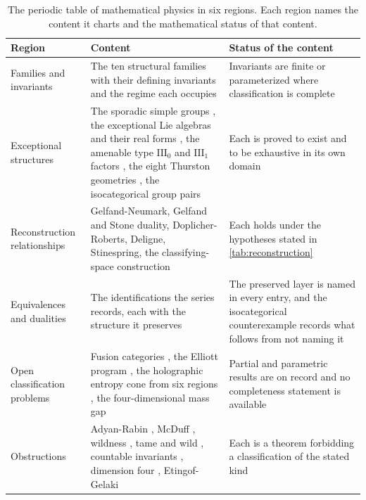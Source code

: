 \documentclass[11pt,letterpaper]{article}
\theoremstyle{definition}
\theoremstyle{remark}
\begin{document}
\begin{table}[t]
\centering
\small
\caption{The periodic table of mathematical physics in six regions. Each region names the content it charts and the mathematical status of that content.}
\label{tab:periodic}
\begin{tabularx}{\textwidth}{Y{0.62}Y{1.38}Y{1.0}}
\toprule
Region & Content & Status of the content \\
\midrule
Families and invariants & The ten structural families with their defining invariants and the regime each occupies & Invariants are finite or parameterized where classification is complete \\
Exceptional structures & The sporadic simple groups \cite{corpus-1,corpus-3}, the exceptional Lie algebras and their real forms \cite{corpus-4}, the amenable type $\mathrm{III}_0$ and $\mathrm{III}_1$ factors \cite{corpus-64}, the eight Thurston geometries \cite{corpus-60}, the isocategorical group pairs \cite{corpus-74} & Each is proved to exist and to be exhaustive in its own domain \\
Reconstruction relationships & Gelfand-Neumark, Gelfand and Stone duality, Doplicher-Roberts, Deligne, Stinespring, the classifying-space construction \cite{corpus-42,corpus-43,corpus-44,corpus-12,corpus-13,corpus-10,corpus-17,corpus-18} & Each holds under the hypotheses stated in \cref{tab:reconstruction} \\
Equivalences and dualities & The identifications the series records, each with the structure it preserves & The preserved layer is named in every entry, and the isocategorical counterexample \cite{corpus-74} records what follows from not naming it \\
Open classification problems & Fusion categories \cite{corpus-14}, the Elliott program \cite{corpus-8}, the holographic entropy cone from six regions \cite{corpus-47}, the four-dimensional mass gap \cite{corpus-23} & Partial and parametric results are on record and no completeness statement is available \\
Obstructions & Adyan-Rabin \cite{corpus-53}, McDuff \cite{corpus-65}, wildness \cite{corpus-55,corpus-56,corpus-58}, tame and wild \cite{corpus-57}, countable invariants \cite{corpus-59}, dimension four \cite{corpus-54}, Etingof-Gelaki \cite{corpus-74} & Each is a theorem forbidding a classification of the stated kind \\
\bottomrule
\end{tabularx}
\end{table}
\end{document}
